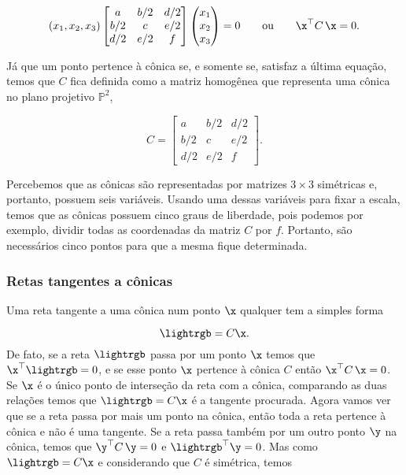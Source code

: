 \begin{equation*}
(x_1,x_2,x_3) 
 \begin{bmatrix}
  a & b/2 & d/2\\
  b/2 & c & e/2\\
  d/2 & e/2 & f
  \end{bmatrix}
 \begin{pmatrix}
  x_1\\
  x_2\\
  x_3
  \end{pmatrix}
 = 0
 \qquad \text{ou} \qquad
 \x^\top C\,\x = 0.
\end{equation*}

Já que um ponto pertence à cônica se, e somente se, satisfaz a última equação, temos que $C$ fica definida como a matriz homogênea que representa uma cônica no plano projetivo $\mathbb{P}^2$,

\begin{equation*}
C =  \begin{bmatrix}
      a & b/2 & d/2\\
      b/2 & c & e/2\\
      d/2 & e/2 & f
      \end{bmatrix}.
\end{equation*}

Percebemos que as cônicas são representadas por matrizes $3\times3$ simétricas e, portanto, possuem seis variáveis. Usando uma dessas variáveis para fixar a escala, temos que as cônicas possuem cinco graus de liberdade, pois podemos por exemplo, dividir todas as coordenadas da matriz $C$ por $f$. Portanto, são necessários cinco pontos para que a mesma fique determinada.  \\

\subsubsection{Retas tangentes a cônicas} 

Uma reta tangente a uma cônica num ponto $\x$ qualquer tem a simples forma

\begin{equation*}
\lightrgb=C\x.
\end{equation*}
De fato, se a reta $\lightrgb$ passa por um ponto $\x$ temos que $\x^\top\lightrgb=0$, e se esse ponto $\x$ pertence à cônica $C$ então $\x^\top C\,\x=0$. Se $\x$ é o único ponto de interseção da reta com a cônica, comparando as duas relações  temos que $\lightrgb=C\x$ é a tangente procurada. Agora vamos ver que se a reta passa por mais um ponto na cônica, então toda a reta pertence à cônica e não é uma tangente.
Se a reta passa também por um outro ponto $\y$ na cônica, temos que $\y^\top C\,\y=0$ e $\lightrgb^\top\y=0$. Mas como $\lightrgb=C\x$ e considerando que $C$ é simétrica, temos

